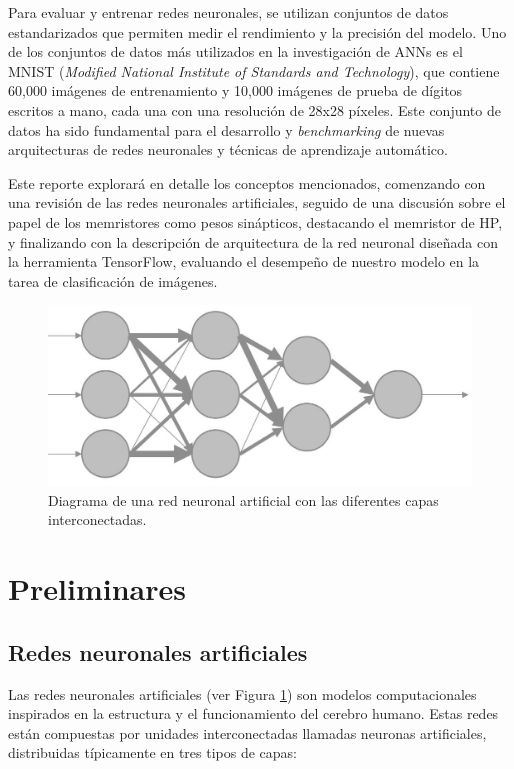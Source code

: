 \documentclass[conference]{IEEEtran}
\begin{document}
Para evaluar y entrenar redes neuronales, se utilizan conjuntos de datos estandarizados que permiten medir el rendimiento y la precisión del modelo. Uno de los conjuntos de datos más utilizados en la investigación de ANNs es el MNIST (\textit{Modified National Institute of Standards and Technology}), que contiene 60,000 imágenes de entrenamiento y 10,000 imágenes de prueba de dígitos escritos a mano, cada una con una resolución de 28x28 píxeles. Este conjunto de datos ha sido fundamental para el desarrollo y \textit{benchmarking} de nuevas arquitecturas de redes neuronales y técnicas de aprendizaje automático.

Este reporte explorará en detalle los conceptos mencionados, comenzando con una revisión de las redes neuronales artificiales, seguido de una discusión sobre el papel de los memristores como pesos sinápticos, destacando el memristor de HP, y finalizando con la descripción de arquitectura de la red neuronal diseñada con la herramienta TensorFlow, evaluando el desempeño de nuestro modelo en la tarea de clasificación de imágenes.

\begin{figure}[ht]
	\centering
	\includegraphics[scale=0.2]{img/ANN.png}
	\caption{Diagrama de una red neuronal artificial con las diferentes capas interconectadas.
		\label{fig:ann}}
\end{figure}

\section{Preliminares}

\subsection{Redes neuronales artificiales}
Las redes neuronales artificiales (ver Figura \ref{fig:ann}) son modelos computacionales inspirados en la estructura y el funcionamiento del cerebro humano. Estas redes están compuestas por unidades interconectadas llamadas neuronas artificiales, distribuidas típicamente en tres tipos de capas:
\end{document}
